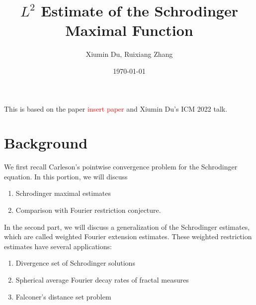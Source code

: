 \documentclass[openany]{book}
\title{$L^2$ Estimate of the Schrodinger Maximal Function}
\date{\today}
\author{Xiumin Du, Ruixiang Zhang}
\begin{document}
\maketitle

\tableofcontents



\newpage

This is based on the paper \textcolor{red}{insert paper} and Xiumin Du's ICM 2022 talk.

\chapter{Background}
We first recall Carleson's pointwise convergence problem for the Schrodinger equation. In this portion, we will discuss
\begin{enumerate}
    \item Schrodinger maximal estimates
    \item Comparison with Fourier restriction conjecture.
\end{enumerate}
In the second part, we will discuss a generalization of the Schrodinger estimates, which are called weighted Fourier extension estimates. These weighted restriction estimates have several applications:
\begin{enumerate}
    \item Divergence set of Schrodinger solutions
    \item Spherical average Fourier decay rates of fractal measures
    \item Falconer's distance set problem
\end{enumerate}
\end{document}
